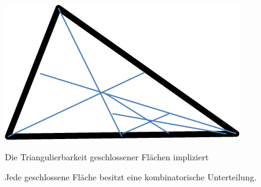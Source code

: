 \documentclass[a4paper,11pt,notitlepage]{report}
\theoremstyle{definition}
\begin{document}
	\begin{center}
		\includegraphics[scale=0.5]{images/2012_01_12_Bild6.png}
	\end{center}
	Die Triangulierbarkeit geschlossener Flächen impliziert
	
	\begin{theorem}
		Jede geschlossene Fläche besitzt eine kombinatorische Unterteilung.
	\end{theorem}
	
\end{document}
